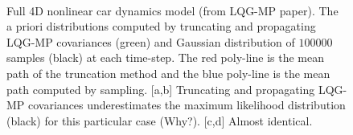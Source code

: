 \documentclass[letterpaper]{article}
\begin{document}
\begin{figure}[h]
\begin{center}
\\
\vspace{-20pt}
\end{center}
\caption{ Full 4D nonlinear car dynamics model (from LQG-MP paper). The a priori distributions computed by truncating and propagating LQG-MP covariances (green) and Gaussian distribution of $100000$ samples (black) at each time-step. The red poly-line is the mean path of the truncation method and the blue poly-line is the mean path computed by sampling. [a,b] Truncating and propagating LQG-MP covariances underestimates the maximum likelihood distribution (black) for this particular case (Why?). [c,d] Almost identical.}
\label{fig:panel1}
\end{figure}
\end{document}
